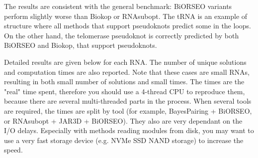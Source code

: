 \documentclass{article}
\begin{document}

The results are consistent with the general benchmark: BiORSEO variants perform slightly worse than Biokop or RNAsubopt.
The tRNA is an example of structure where all methods that support pseudoknots predict some in the loops. On the other hand, the telomerase pseudoknot is correctly predicted by both BiORSEO and Biokop, that support pseudoknots. 

Detailed results are given below for each RNA. The number of unique solutions and computation times are also reported. Note that these cases are small RNAs, resulting in both small number of solutions and small times. The times are the "real" time spent, therefore you should use a 4-thread CPU to reproduce them, because there are several multi-threaded parts in the process. When several tools are required, the times are split by tool (for example, BayesPairing + BiORSEO, or RNAsubopt + JAR3D + BiORSEO). They also are very dependant on the I/O delays. Especially with methods reading modules from disk, you may want to use a very fast storage device (e.g. NVMe SSD NAND storage) to increase the speed.
\end{document}
